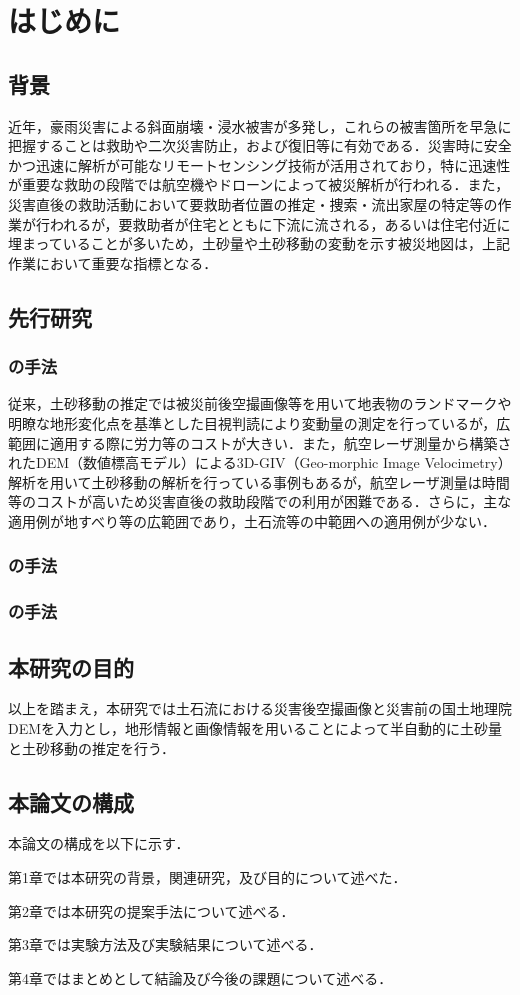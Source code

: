 \chapter{はじめに}
  \section{背景}
    近年，豪雨災害による斜面崩壊・浸水被害が多発し，これらの被害箇所を早急に把握することは救助や二次災害防止，および復旧等に有効である．災害時に安全かつ迅速に解析が可能なリモートセンシング技術が活用されており，特に迅速性が重要な救助の段階では航空機やドローンによって被災解析が行われる．また，災害直後の救助活動において要救助者位置の推定・捜索・流出家屋の特定等の作業が行われるが，要救助者が住宅とともに下流に流される，あるいは住宅付近に埋まっていることが多いため，土砂量や土砂移動の変動を示す被災地図は，上記作業において重要な指標となる．


  \section{先行研究}
    \subsection{の手法}
      従来，土砂移動の推定では被災前後空撮画像等を用いて地表物のランドマークや明瞭な地形変化点を基準とした目視判読により変動量の測定を行っているが\cite{先行研究1}，広範囲に適用する際に労力等のコストが大きい．また，航空レーザ測量から構築されたDEM（数値標高モデル）による3D-GIV（Geo-morphic Image Velocimetry）解析を用いて土砂移動の解析を行っている事例もあるが\cite{先行研究2}，航空レーザ測量は時間等のコストが高いため災害直後の救助段階での利用が困難である．さらに，主な適用例が地すべり等の広範囲であり，土石流等の中範囲への適用例が少ない．

    \subsection{の手法}

    \subsection{の手法}

  \section{本研究の目的}
    以上を踏まえ，本研究では土石流における災害後空撮画像と災害前の国土地理院DEM\cite{使用データ1}を入力とし，地形情報と画像情報を用いることによって半自動的に土砂量と土砂移動の推定を行う．


  \section{本論文の構成}
    本論文の構成を以下に示す．
    
    第1章では本研究の背景，関連研究，及び目的について述べた．

    第2章では本研究の提案手法について述べる．
    
    第3章では実験方法及び実験結果について述べる．

    第4章ではまとめとして結論及び今後の課題について述べる．


